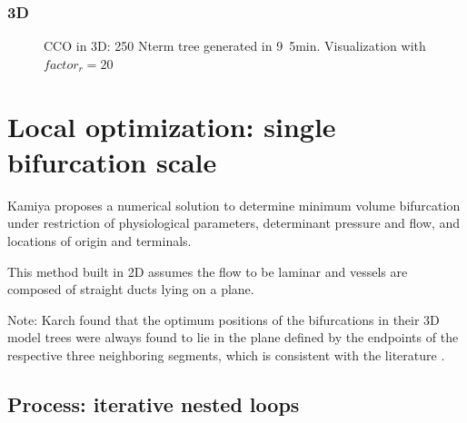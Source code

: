 \documentclass[a4paper, 11pt]{article} %
\begin{document}
\subsubsection{3D}
\begin{figure}[!h]
\centering
{}
\caption{CCO in 3D: 250 Nterm tree generated in \unit{9.5}{min}. Visualization with $ factor_r = 20 $}
\label{fig:CCO 2D}
\end{figure}



\section{Local optimization: single bifurcation scale}\label{Kamiya}
Kamiya proposes a numerical solution to determine minimum volume bifurcation under restriction of physiological parameters, determinant pressure and flow, and locations of origin and terminals.

This method built in 2D assumes the flow to be laminar and vessels are composed of straight ducts lying on a plane. 

Note: Karch found that the optimum positions of the bifurcations in their 3D model trees were always found to lie in the plane defined by the endpoints of the respective three neighboring segments, which is consistent with the literature \cite{zamir1986branching}. 


\subsection*{Process: iterative nested loops}
\end{document}
